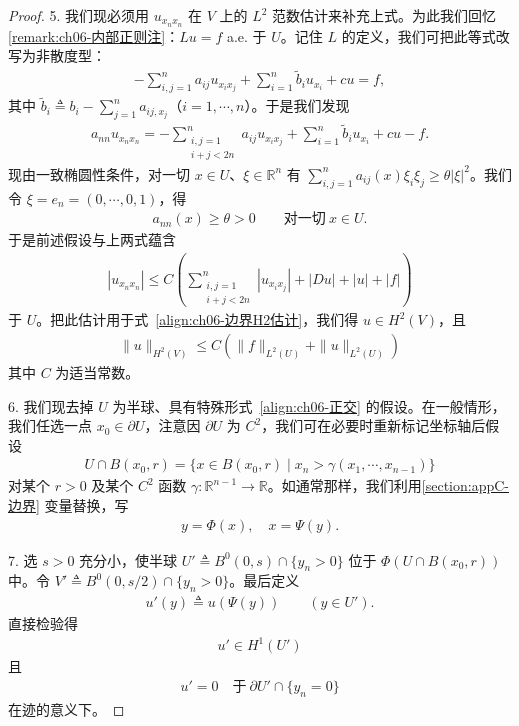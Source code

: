 \documentclass[../../main.tex]{subfiles}
\begin{document}
\begin{proof}
5. 我们现必须用 $u_{x_{n}x_{n}}$ 在 $V$ 上的 $L^{2}$ 范数估计来补充上式。为此我们回忆\cref{remark:ch06-内部正则注}：$Lu=f$ a.e. 于 $U$。记住 $L$ 的定义，我们可把此等式改写为非散度型：
\begin{align}
-\sum_{i,j=1}^{n}a_{ij}u_{x_{i}x_{j}}+\sum_{i=1}^{n}\widetilde{b}_{i}u_{x_{i}}+cu=f,
\end{align}
其中 $\widetilde{b}_{i}\triangleq b_{i}-\sum_{j=1}^{n}a_{ij,x_{j}}$（$i=1,\cdots,n$）。于是我们发现
\begin{align}
a_{nn}u_{x_{n}x_{n}}=-\sum_{\substack{i,j=1\\ i+j<2n}}^{n}a_{ij}u_{x_{i}x_{j}}+\sum_{i=1}^{n}\widetilde{b}_{i}u_{x_{i}}+cu-f.
\end{align}
现由一致椭圆性条件，对一切 $x\in U$、$\xi\in\mathbb{R}^{n}$ 有 $\sum_{i,j=1}^{n}a_{ij}(x)\xi_{i}\xi_{j}\geqslant\theta|\xi|^{2}$。我们令 $\xi=e_{n}=(0,\cdots,0,1)$，得
\begin{align}
a_{nn}(x)\geqslant\theta>0\qquad\text{对一切}\ x\in U.
\end{align}
于是前述假设与上两式蕴含
\begin{align}
|u_{x_{n}x_{n}}|\leqslant C\left(\sum_{\substack{i,j=1\\ i+j<2n}}^{n}|u_{x_{i}x_{j}}|+|Du|+|u|+|f|\right)
\end{align}
于 $U$。把此估计用于式~\eqref{align:ch06-边界H2估计}，我们得 $u\in H^{2}(V)$，且
\begin{align}
\|u\|_{H^{2}(V)}\leqslant C(\|f\|_{L^{2}(U)}+\|u\|_{L^{2}(U)})
\end{align}
其中 $C$ 为适当常数。

6. 我们现去掉 $U$ 为半球、具有特殊形式~\eqref{align:ch06-正交} 的假设。在一般情形，我们任选一点 $x_{0}\in\partial U$，注意因 $\partial U$ 为 $C^{2}$，我们可在必要时重新标记坐标轴后假设
\begin{align*}
U\cap B(x_{0},r)=\{x\in B(x_{0},r)\mid x_{n}>\gamma(x_{1},\cdots,x_{n-1})\}
\end{align*}
对某个 $r>0$ 及某个 $C^{2}$ 函数 $\gamma:\mathbb{R}^{n-1}\to\mathbb{R}$。如通常那样，我们利用\cref{section:appC-边界} 变量替换，写
\begin{align}
y=\Phi(x),\quad x=\Psi(y).
\end{align}

7. 选 $s>0$ 充分小，使半球 $U'\triangleq B^{0}(0,s)\cap\{y_{n}>0\}$ 位于 $\Phi(U\cap B(x_{0},r))$ 中。令 $V'\triangleq B^{0}(0,s/2)\cap\{y_{n}>0\}$。最后定义
\begin{align}
u'(y)\triangleq u(\Psi(y))\qquad (y\in U').
\end{align}
直接检验得
\begin{align}
u'\in H^{1}(U')
\end{align}
且
\begin{align}
u'=0\quad\text{于}\ \partial U'\cap\{y_{n}=0\}
\end{align}
在迹的意义下。


\end{proof}
\end{document}
